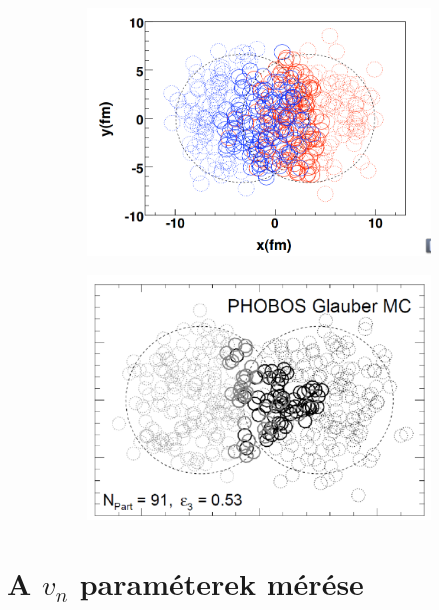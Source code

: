 \documentclass{beamer}
\begin{document}
\begin{frame}
\begin{center}
\begin{figure}[H]
	\centering
    \begin{subfigure}[b]{0.49\textwidth}
    		\includegraphics[width=\textwidth]{pic/u1}
	\end{subfigure}
	\begin{subfigure}[b]{0.49\textwidth}
        	\includegraphics[width=\textwidth]{pic/u2}
	\end{subfigure}
\end{figure}
\end{center}
\end{frame}

\section{A $v_n$ paraméterek mérése}
\end{document}
